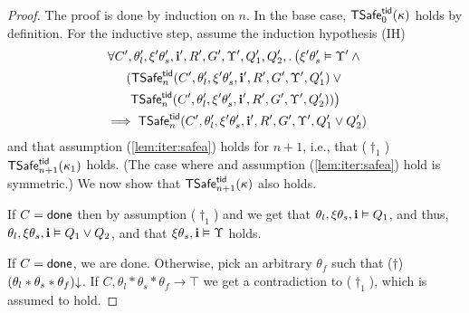 \begin{proof}
The proof is done by induction on $n$.
In the base case, ${\sf TSafe}^{{\sf tid}}_0(\kappa)$ holds by definition.
For the inductive step, 
assume 
the induction hypothesis (IH)  
\begin{multline*}
  \forall C',\theta'_l,\xi'\theta'_s,{\bf i}',R',G',\Upsilon', Q_1', Q_2',.\,
  \big(\xi'\theta_s' \vDash \Upsilon' \land \mbox{}\\
  ({\sf TSafe}^{{\sf tid}}_n(C',\theta'_l,\xi'\theta'_s,{\bf i}',R',G',\Upsilon', Q_1') \lor \mbox{}\\
   {\sf TSafe}^{{\sf tid}}_n(C',\theta'_l,\xi'\theta'_s,{\bf i}',R',G',\Upsilon', Q_2'))\big)\\ 
   \mbox{}\implies  {\sf TSafe}^{{\sf tid}}_n(C',\theta'_l,\xi'\theta'_s,{\bf i}',R',G',\Upsilon', Q_1' \lor Q'_2)   
\end{multline*}
and that assumption  (\ref{lem:iter:safea}) holds  for $n+1$, i.e., 
that ($\dagger_1$) ${\sf TSafe}^{{\sf tid}}_{n+1}(\kappa_1)$ holds.
(The case where and assumption  (\ref{lem:iter:safea}) hold is symmetric.)
We now show that ${\sf TSafe}^{{\sf tid}}_{n+1}(\kappa)$ also holds.

If $C = {\sf done}$ then by assumption ($\dagger_1$) and  we get that 
$\theta_l,\xi\theta_s,{\bf i} \vDash Q_1$, and thus, $\theta_l,\xi\theta_s,{\bf i} \vDash Q_1 \lor Q_2$,
and  that $\xi\theta_s,{\bf i} \vDash \Upsilon$ holds.


If $C={\sf done}$, we are done.
Otherwise, 
pick an arbitrary $\theta_f$ such that ($\dagger$) $(\theta_l*\theta_s*\theta_f)\mathpunct{\downarrow}$.
If $C,\theta_l*\theta_s*\theta_f \rightarrow \top$   we get a contradiction to ($\dagger_1$),
which is  assumed to hold.




\end{proof}

